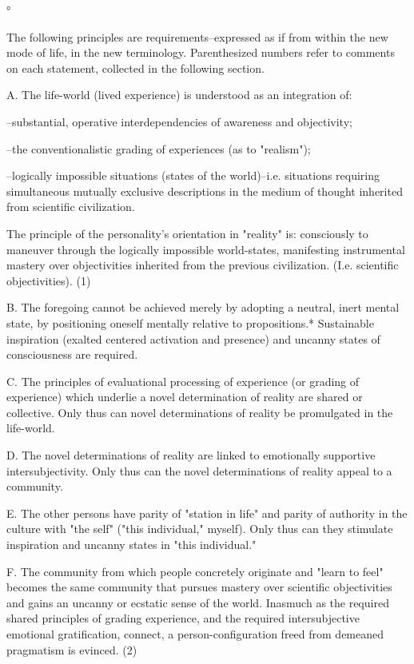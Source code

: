 \begin{enumerate}[label=\alph*.]
°

The following principles are requirements–expressed as if from within the new mode of life, in the new terminology. Parenthesized numbers refer to comments on each statement, collected in the following section.

A. The life-world (lived experience) is understood as an integration of:

–substantial, operative interdependencies of awareness and objectivity;

–the conventionalistic grading of experiences (as to "realism");

–logically impossible situations (states of the world)–i.e. situations requiring simultaneous mutually exclusive descriptions in the medium of thought inherited from scientific civilization.

The principle of the personality's orientation in "reality" is: consciously to maneuver through the logically impossible world-states, manifesting instrumental mastery over objectivities inherited from the previous civilization. (I.e. scientific objectivities). (1)

B. The foregoing cannot be achieved merely by adopting a neutral, inert mental state, by positioning oneself mentally relative to propositions.* Sustainable inspiration (exalted centered activation and presence) and uncanny states of consciousness are required.

C. The principles of evaluational processing of experience (or grading of experience) which underlie a novel determination of reality are shared or collective. Only thus can novel determinations of reality be promulgated in the life-world.

D. The novel determinations of reality are linked to emotionally supportive intersubjectivity. Only thus can the novel determinations of reality appeal to a community.

E. The other persons have parity of "station in life" and parity of authority in the culture with "the self" ("this individual," myself). Only thus can they stimulate inspiration and uncanny states in "this individual."

F. The community from which people concretely originate and "learn to feel" becomes the same community that pursues mastery over scientific objectivities and gains an uncanny or ecstatic sense of the world. Inasmuch as the required shared principles of grading experience, and the required intersubjective emotional gratification, connect, a person-configuration freed from demeaned pragmatism is evinced. (2)


\end{enumerate}
